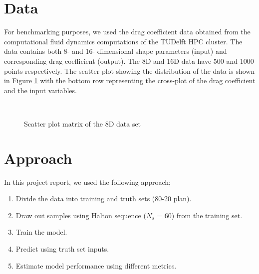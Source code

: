 \documentclass[11pt, letterpaper]{article}
\begin{document}
\section{Data}
For benchmarking purposes, we used the drag coefficient data obtained from the computational fluid dynamics computations of the TUDelft HPC cluster. The data contains both 8- and 16- dimensional shape parameters (input) and corresponding drag coefficient (output). The 8D and 16D data have 500 and 1000 points respectively. The scatter plot showing the distribution of the data is shown in Figure \ref{scatter} with the bottom row representing the cross-plot of the drag coefficient and the input variables.

\begin{figure}[!h]
	\begin{center}
		\vspace{-10pt}
		\mbox{  
		 }
		\caption{Scatter plot matrix of the 8D data set}
		\label{scatter}
	\end{center}
\end{figure}



\section{Approach}
In this project report, we used the following approach;
\begin{enumerate}
    \item Divide the data into training and truth sets (80-20 plan).
    \item Draw out samples using Halton sequence ($N_s${ = 60}) from the training set.
    \item Train the model.
    \item Predict using truth set inputs.
    \item Estimate model performance using different metrics.
\end{enumerate}
\end{document}
